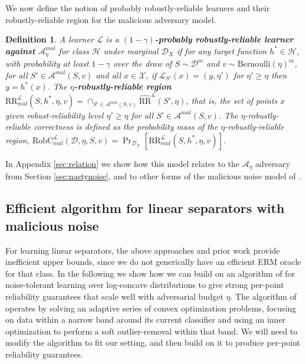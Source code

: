 \documentclass[11pt]{article}
\newcommand{\CR}{\text{RR}}
\newcommand{\ECR}{\widehat{\text{RR}}}
\newtheorem{definition}{Definition}
\newcommand{\0}{\mathbf{0}}
\newcommand{\1}{\mathbf{1}}
\newcommand{\cA}{\mathcal{A}}
\newcommand{\cD}{\mathcal{D}}
\newcommand{\cH}{\mathcal{H}}
\newcommand{\cL}{\mathcal{L}}
\newcommand{\cX}{\mathcal{X}}
\begin{document}
We now define the notion of probably robustly-reliable learners and their robustly-reliable region for the malicious adversary model.
\begin{definition}
A learner $\cL$ is a {\bf $(1-\gamma)$-probably robustly-reliable learner against $\cA^{mal}_\eta$} for class $\cH$
under marginal $\cD_X$
if for any target function $h^*\in\cH$, with probability at least $1-\gamma$ over the draw of $S\sim\cD^m$ and $v \sim \mbox{Bernoulli}(\eta)^m$, for all $S' \in \cA^{mal}(S,v)$ and all $x\in\cX$, if $\cL_{S'}(x)=(y,\eta')$ for $\eta'\geq \eta$ then $y= h^*(x)$.  The {\bf $\eta$-robustly-reliable region} $\CR_{mal}^{\cL}(S,h^*,\eta,v) = \cap_{S' \in \cA^{mal}(S,v)} \ECR^{\cL}(S',\eta)$, that is,
the set of points $x$ given robust-reliability level $\eta'\geq \eta$ for all $S' \in \cA^{mal}(S,v)$. The $\eta$-robustly-reliable correctness is defined as the probability mass of the $\eta$-robustly-reliable region, $\text{RobC}_{mal}^\cL(\cD,\eta,S,v)=\Pr_{\cD_\cX}[\CR_{mal}^{\cL}(S,h^*,\eta,v)]$.
\label{def:pcl_mal_strong}
\end{definition}

In Appendix \ref{sec:relation} we show how this model relates to the $\cA_\eta$ adversary from Section \ref{sec:nastynoise}, and to other forms of the malicious noise model of \cite{kearns1993learning}.



\subsection{Efficient algorithm for linear separators with malicious noise}

For learning linear separators, the above approaches and prior work \cite{gao2021learning} provide inefficient upper bounds, since we do not generically have an efficient ERM oracle for that class.
In the following we show how we can build on an algorithm of \cite{awasthi2017power} for noise-tolerant learning over log-concave distributions to give strong per-point reliability guarantees that scale well with adversarial budget $\eta$. The algorithm of \cite{awasthi2017power} operates by solving an adaptive series of convex optimization problems, focusing on data within a narrow band around its current classifier and using an inner optimization to perform a soft outlier-removal within that band. We will need to modify the algorithm  to fit our setting, and then build on it to produce per-point reliability guarantees.
\end{document}
